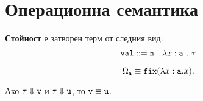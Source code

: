 \section{Операционна семантика}

{\bf Стойност} е затворен терм от следния вид:
\[ \vv{val} ::= \vv{n}\ |\ \lambda x:\vv{a}\ .\ \tau\]

\begin{prooftree}
\end{prooftree}

\begin{prooftree}
\end{prooftree}

\begin{prooftree}
\end{prooftree}


\begin{example}
  \[\Omega_{\vv{a}} \equiv \fix(\lambda x:\vv{a} . x).\]
\end{example}


\begin{lemma}
  Ако $\tau \Downarrow \vv{v}$ и $\tau \Downarrow \vv{u}$, то $\vv{v} \equiv \vv{u}$.
\end{lemma}



